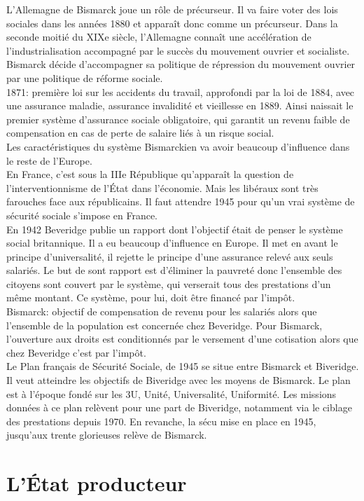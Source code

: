 \documentclass[10pt, a4paper, openany]{book}
\begin{document}
L'Allemagne de Bismarck joue un rôle de précurseur. Il va faire voter des lois sociales dans les années 1880 et apparaît donc comme un précurseur. Dans la seconde moitié du XIXe siècle, l'Allemagne connaît une accélération de l'industrialisation accompagné par le succès du mouvement ouvrier et socialiste. Bismarck décide d'accompagner sa politique de répression du mouvement ouvrier par une politique de réforme sociale. \\
1871: première loi sur les accidents du travail, approfondi par la loi de 1884, avec une assurance maladie, assurance invalidité et vieillesse en 1889. Ainsi naissait le premier système d'assurance sociale obligatoire, qui garantit un revenu faible de compensation en cas de perte de salaire liés à un risque social. \\
Les caractéristiques du système Bismarckien va avoir beaucoup d'influence dans le reste de l'Europe. \\
En France, c'est sous la IIIe République qu'apparaît la question de l'interventionnisme de l'État dans l'économie. Mais les libéraux sont très farouches face aux républicains. Il faut attendre 1945 pour qu'un vrai système de sécurité sociale s'impose en France. \\
En 1942 Beveridge publie un rapport dont l'objectif était de penser le système social britannique. Il a eu beaucoup d'influence en Europe. Il met en avant le principe d'universalité, il rejette le principe d'une assurance relevé aux seuls salariés. Le but de sont rapport est d'éliminer la pauvreté donc l'ensemble des citoyens sont couvert par le système, qui verserait tous des prestations d'un même montant. Ce système, pour lui, doit être financé par l'impôt. \\
Bismarck: objectif de compensation de revenu pour les salariés alors que l'ensemble de la population est concernée chez Beveridge. Pour Bismarck, l'ouverture aux droits est conditionnés par le versement d'une cotisation alors que chez Beveridge c'est par l'impôt. \\
Le Plan français de Sécurité Sociale, de 1945 se situe entre Bismarck et Biveridge. Il veut atteindre les objectifs de Biveridge avec les moyens de Bismarck. Le plan est à l'époque fondé sur les 3U, Unité, Universalité, Uniformité. Les missions données à ce plan relèvent pour une part de Biveridge, notamment via le ciblage des prestations depuis 1970. En revanche, la sécu mise en place en 1945, jusqu'aux trente glorieuses relève de Bismarck. 

\section{L'État producteur}
\end{document}
